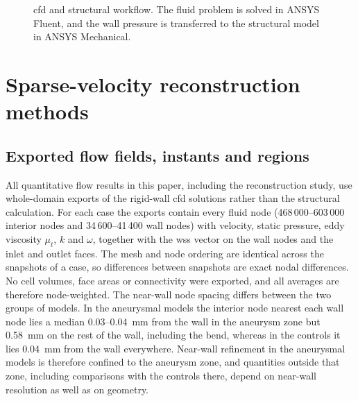 \documentclass[12pt,a4paper]{article}
\newcommand{\CFD}{\ac{cfd}\xspace}
\newcommand{\WSS}{\ac{wss}\xspace}
\newcommand{\CFDcap}{\Ac{cfd}\xspace}
\theoremstyle{definition}
\numberwithin{equation}{section}
\begin{document}
\begin{figure}[!ht]
{%
  }
  \caption{\CFDcap and structural workflow. The fluid problem is solved in ANSYS Fluent, and the wall pressure is transferred to the structural model in ANSYS Mechanical.}
  \label{fig:Flowchart}
\end{figure}



\section{Sparse-velocity reconstruction methods}
\label{sec:reconstruction_methods}
\subsection{Exported flow fields, instants and regions}
\label{sec:exports}
All quantitative flow results in this paper, including the reconstruction study, use whole-domain exports of the rigid-wall \CFD solutions rather than the structural calculation. For each case the exports contain every fluid node (468\,000--603\,000 interior nodes and 34\,600--41\,400 wall nodes) with velocity, static pressure, eddy viscosity $\mu_t$, $k$ and $\omega$, together with the \WSS vector on the wall nodes and the inlet and outlet faces. The mesh and node ordering are identical across the snapshots of a case, so differences between snapshots are exact nodal differences. No cell volumes, face areas or connectivity were exported, and all averages are therefore node-weighted. The near-wall node spacing differs between the two groups of models. In the aneurysmal models the interior node nearest each wall node lies a median 0.03--0.04~mm from the wall in the aneurysm zone but 0.58~mm on the rest of the wall, including the bend, whereas in the controls it lies 0.04~mm from the wall everywhere. Near-wall refinement in the aneurysmal models is therefore confined to the aneurysm zone, and quantities outside that zone, including comparisons with the controls there, depend on near-wall resolution as well as on geometry.
\end{document}
